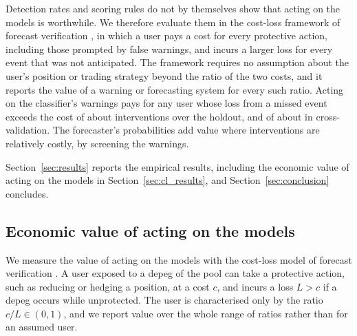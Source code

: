Detection rates and scoring rules do not by themselves show that acting on the models is worthwhile. We
therefore evaluate them in the cost-loss framework of forecast verification
\citep{Murphy1977,Richardson2000}, in which a user pays a cost for every protective action, including those
prompted by false warnings, and incurs a larger loss for every event that was not anticipated. The framework
requires no assumption about the user's position or trading strategy beyond the ratio of the two costs, and
it reports the value of a warning or forecasting system for every such ratio. Acting on the classifier's
warnings pays for any user whose loss from a missed event exceeds the cost of about \clHoPays{}
interventions over the holdout, and of about \clCvPays{} in cross-validation. The forecaster's probabilities
add value where interventions are relatively costly, by screening the warnings.

Section~\ref{sec:results} reports the empirical results, including the economic value of acting on the
models in Section~\ref{sec:cl_results}, and Section~\ref{sec:conclusion} concludes.


\subsection{Economic value of acting on the models}\label{sec:cl_method}

We measure the value of acting on the models with the cost-loss model of forecast verification
\citep{Murphy1977,Richardson2000}. A user exposed to a depeg of the pool can take a protective action, such
as reducing or hedging a position, at a cost $c$, and incurs a loss $L>c$ if a depeg occurs while
unprotected. The user is characterised only by the ratio $c/L\in(0,1)$, and we report value over the whole
range of ratios rather than for an assumed user.


